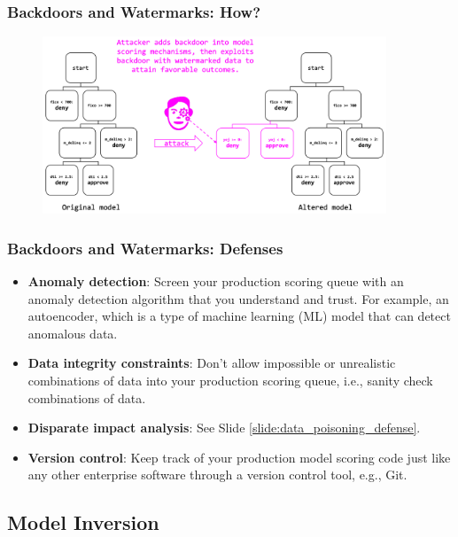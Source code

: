 \documentclass[11pt,
               aspectratio=169,
               hyperref={colorlinks}
               ]{beamer}
\begin{document}
			\begin{frame}
		
				\frametitle{Backdoors and Watermarks: \textbf{How?}}		
			
				\begin{figure}[htb]
					\begin{center}
						\includegraphics[height=150pt]{img/watermark.PNG}
					\end{center}
				\end{figure}	

			\end{frame}
		
			\begin{frame}[label={slide:watermark_defense}]
		
				\frametitle{Backdoors and Watermarks: \textbf{Defenses}}
				\begin{itemize}
				\item \textbf{Anomaly detection}: Screen your production scoring queue with an anomaly detection algorithm that you understand and trust. For example, an autoencoder, which is a type of machine learning (ML) model that can detect anomalous data. 
				\item \textbf{Data integrity constraints}: Don’t allow impossible or unrealistic combinations of data into your production scoring queue, i.e., sanity check combinations of data.
				\item \textbf{Disparate impact analysis}: See Slide \ref{slide:data_poisoning_defense}.
				\item \textbf{Version control}: Keep track of your production model scoring code just like any other enterprise software through a version control tool, e.g., Git.
				\end{itemize}
				
			\end{frame}


		\subsection{Model Inversion}
			
\end{document}
